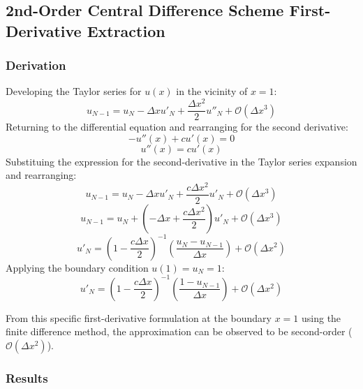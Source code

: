 \documentclass[10pt, reqno]{article}		%
\numberwithin{equation}{section}
\begin{document}
\newpage

\subsection{2nd-Order Central Difference Scheme First-Derivative Extraction}

\subsubsection{Derivation}

Developing the Taylor series for $u(x)$ in the vicinity of $x = 1$:
\begin{equation}
u_{N-1} = u_N - \Delta x u'_N + \frac{\Delta x^2}{2} u''_N + \mathcal{O}(\Delta x^3)
\end{equation}
Returning to the differential equation and rearranging for the second derivative:
\begin{equation}
-u''(x)+cu'(x)=0
\end{equation}
\begin{equation}
u''(x)=cu'(x)
\end{equation}
Substituing the expression for the second-derivative in the Taylor series expansion and rearranging:
\begin{equation}
u_{N-1} = u_N - \Delta x u'_N + \frac{c\Delta x^2}{2} u'_N + \mathcal{O}(\Delta x^3)
\end{equation} 
\begin{equation}
u_{N-1} = u_N +\left(-\Delta x +\frac{c\Delta x^2}{2}\right) u'_N + \mathcal{O}(\Delta x^3)
\end{equation} 
\begin{equation}
u'_N = \left(1 - \frac{c\Delta x}{2}\right)^{-1} \left(\frac{u_{N}-u_{N-1}}{\Delta x}\right) + \mathcal{O}(\Delta x^2)
\end{equation}
Applying the boundary condition $u(1) = u_N = 1$:
\begin{equation}
u'_N = \left(1 - \frac{c\Delta x}{2}\right)^{-1} \left(\frac{1-u_{N-1}}{\Delta x}\right) + \mathcal{O}(\Delta x^2)
\end{equation}

From this specific first-derivative formulation at the boundary $x = 1$ using the finite difference method, the approximation can be observed to be second-order ($\mathcal{O}(\Delta x^2)$).

\newpage

\subsubsection{Results}
\end{document}

